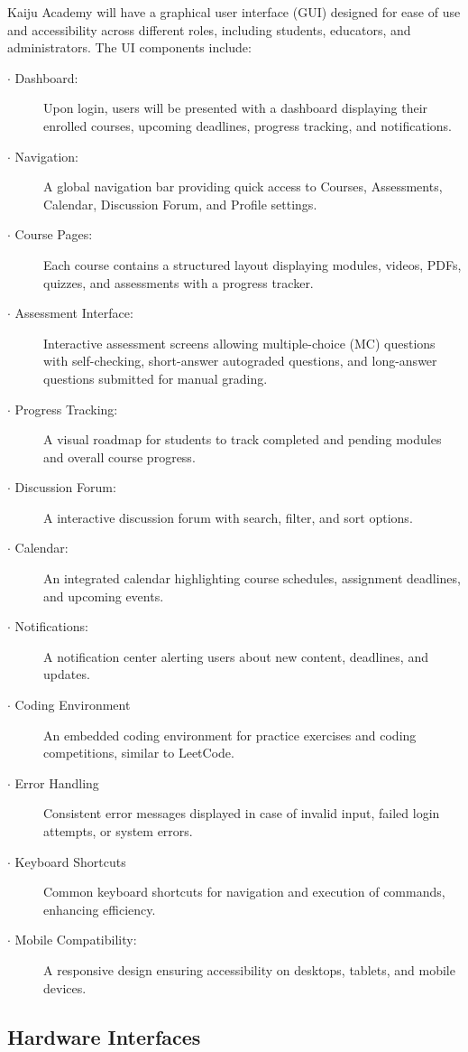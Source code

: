 \documentclass[a4paper, 11pt]{scrreprt}
\begin{document}
Kaiju Academy will have a graphical user interface (GUI) designed for ease of use and accessibility across different roles, including students, educators, and administrators. The UI components include:
\begin{description}
    \item[$\cdot$ Dashboard:] Upon login, users will be presented with a dashboard displaying their enrolled courses, upcoming deadlines, progress tracking, and notifications.
    \item[$\cdot$ Navigation:] A global navigation bar providing quick access to Courses, Assessments, Calendar, Discussion Forum, and Profile settings.
    \item[$\cdot$ Course Pages:] Each course contains a structured layout displaying modules, videos, PDFs, quizzes, and assessments with a progress tracker.
    \item[$\cdot$ Assessment Interface:] Interactive assessment screens allowing multiple-choice (MC) questions with self-checking, short-answer autograded questions, and long-answer questions submitted for manual grading.
    \item[$\cdot$ Progress Tracking:] A visual roadmap for students to track completed and pending modules and overall course progress.
    \item[$\cdot$ Discussion Forum:] A interactive discussion forum with search, filter, and sort options.
    \item[$\cdot$ Calendar:] An integrated calendar highlighting course schedules, assignment deadlines, and upcoming events.
    \item[$\cdot$ Notifications:] A notification center alerting users about new content, deadlines, and updates.
    \item[$\cdot$ Coding Environment] An embedded coding environment for practice exercises and coding competitions, similar to LeetCode.
    \item[$\cdot$ Error Handling] Consistent error messages displayed in case of invalid input, failed login attempts, or system errors.
    \item[$\cdot$ Keyboard Shortcuts] Common keyboard shortcuts for navigation and execution of commands, enhancing efficiency.
    \item[$\cdot$ Mobile Compatibility:] A responsive design ensuring accessibility on desktops, tablets, and mobile devices.
\end{description}

\subsection{Hardware Interfaces}
\end{document}
